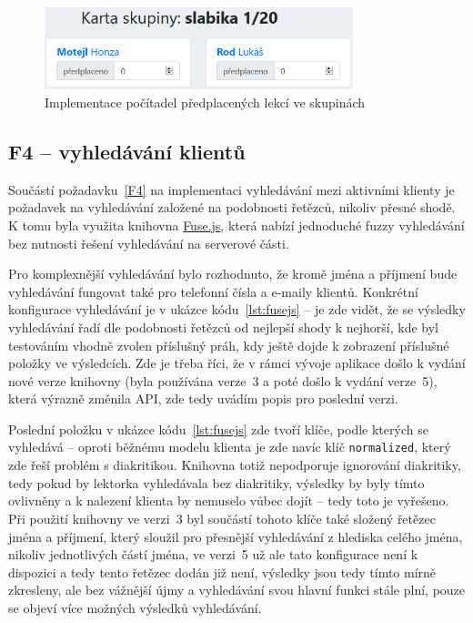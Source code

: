 \begin{figure}[h]\centering
    \includegraphics[width=0.8\textwidth]{img/ui-screen-pocitadla.png}
    \caption{Implementace počítadel předplacených lekcí ve skupinách}\label{fig:ui-screen-pocitadla}
\end{figure}

\subsection{F4 -- vyhledávání klientů}

Součástí požadavku~\ref{F4} na implementaci vyhledávání mezi aktivními klienty je požadavek na vyhledávání založené na podobnosti řetězců, nikoliv přesné shodě. K tomu byla využita knihovna \href{https://fusejs.io/}{Fuse.js}, která nabízí jednoduché fuzzy vyhledávání bez nutnosti řešení vyhledávání na serverové části.

Pro komplexnější vyhledávání bylo rozhodnuto, že kromě jména a příjmení bude vyhledávání fungovat také pro telefonní čísla a e-maily klientů. Konkrétní konfigurace vyhledávání je v ukázce kódu~\ref{lst:fusejs} -- je zde vidět, že se výsledky vyhledávání řadí dle podobnosti řetězců od nejlepší shody k nejhorší, kde byl testováním vhodně zvolen příslušný práh, kdy ještě dojde k zobrazení příslušné položky ve výsledcích. Zde je třeba říci, že v rámci vývoje aplikace došlo k vydání nové verze knihovny (byla používána verze~3 a poté došlo k vydání verze~5), která výrazně změnila API, zde tedy uvádím popis pro poslední verzi.

Poslední položku v ukázce kódu~\ref{lst:fusejs} zde tvoří klíče, podle kterých se vyhledává -- oproti běžnému modelu klienta je zde navíc klíč \verb|normalized|, který zde řeší problém s diakritikou. Knihovna totiž nepodporuje ignorování diakritiky, tedy pokud by lektorka vyhledávala bez diakritiky, výsledky by byly tímto ovlivněny a k nalezení klienta by nemuselo vůbec dojít -- tedy toto je vyřešeno. Při použití knihovny ve verzi~3 byl součástí tohoto klíče také složený řetězec jména a příjmení, který sloužil pro přesnější vyhledávání z hlediska celého jména, nikoliv jednotlivých částí jména, ve verzi~5 už ale tato konfigurace není k dispozici a tedy tento řetězec dodán již není, výsledky jsou tedy tímto mírně zkresleny, ale bez vážnější újmy a vyhledávání svou hlavní funkci stále plní, pouze se objeví více možných výsledků vyhledávání.

